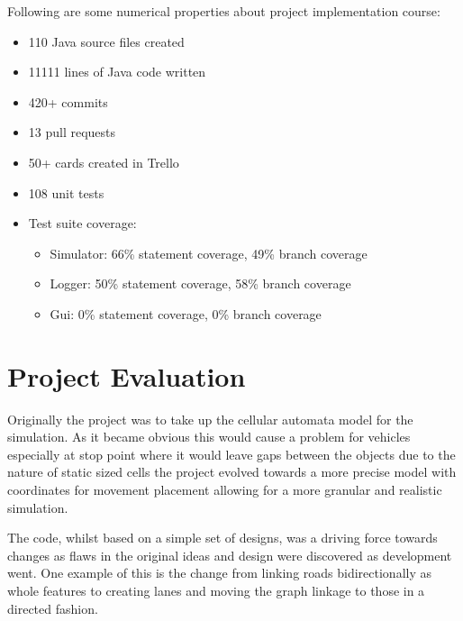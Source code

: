 Following are some numerical properties about project implementation course:
\begin{itemize}
    \item 110 Java source files created
    \item 11111 lines of Java code written
    \item 420+ commits
    \item 13 pull requests
    \item 50+ cards created in Trello
    \item 108 unit tests
    \item Test suite coverage:
    \begin{itemize}
        \item Simulator: 66\% statement coverage, 49\% branch coverage
        \item Logger: 50\% statement coverage, 58\% branch coverage
        \item Gui: 0\% statement coverage, 0\% branch coverage
    \end{itemize}
\end{itemize}

\section{Project Evaluation}
\label{sec:projectEvaluation}

Originally the project was to take up the cellular automata model for the simulation. As it became obvious this would cause a problem for vehicles especially at stop point where it would leave gaps between the objects due to the nature of static sized cells the project evolved towards a more precise model with coordinates for movement placement allowing for a more granular and realistic simulation.

The code, whilst based on a simple set of designs, was a driving force towards changes as flaws in the original ideas and design were discovered as development went. One example of this is the change from linking roads bidirectionally as whole features to creating lanes and moving the graph linkage to those in a directed fashion.

